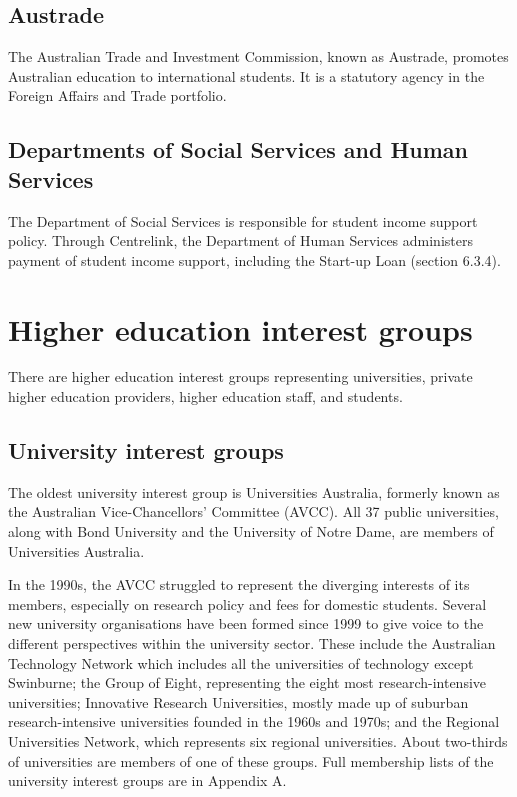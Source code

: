 \documentclass[]{book}
\begin{document}
\hypertarget{austrade}{%
\subsection{Austrade}\label{austrade}}

The Australian Trade and Investment Commission, known as Austrade, promotes Australian education to international students. It is a statutory agency in the Foreign Affairs and Trade portfolio.

\hypertarget{departments-of-social-services-and-human-services}{%
\subsection{Departments of Social Services and Human Services}\label{departments-of-social-services-and-human-services}}

The Department of Social Services is responsible for student income support policy. Through Centrelink, the Department of Human Services administers payment of student income support, including the Start-up Loan (section 6.3.4).

\hypertarget{higher-education-interest-groups}{%
\section{Higher education interest groups}\label{higher-education-interest-groups}}

There are higher education interest groups representing universities, private higher education providers, higher education staff, and students.

\hypertarget{university-interest-groups}{%
\subsection{University interest groups}\label{university-interest-groups}}

The oldest university interest group is Universities Australia, formerly known as the Australian Vice-Chancellors' Committee (AVCC). All 37 public universities, along with Bond University and the University of Notre Dame, are members of Universities Australia.

In the 1990s, the AVCC struggled to represent the diverging interests of its members, especially on research policy and fees for domestic students. Several new university organisations have been formed since 1999 to give voice to the different perspectives within the university sector. These include the Australian Technology Network which includes all the universities of technology except Swinburne; the Group of Eight, representing the eight most research-intensive universities; Innovative Research Universities, mostly made up of suburban research-intensive universities founded in the 1960s and 1970s; and the Regional Universities Network, which represents six regional universities. About two-thirds of universities are members of one of these groups. Full membership lists of the university interest groups are in Appendix A.
\end{document}
